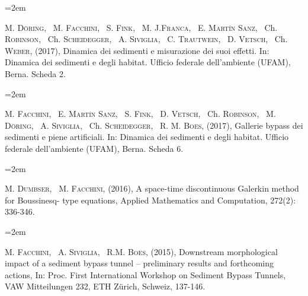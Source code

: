 \documentclass{scrartcl}
\newcommand{\MarginText}[1]{\marginpar{\raggedleft\itshape\small#1}} %
\newcommand{\Description}[1]{\hangindent=2em\hangafter=0\noindent\raggedright\footnotesize{#1}\par\normalsize\vspace{1em}} %
\begin{document}
\begin{cv}{}
	\Description{
	M. \textsc{Döring}, ~M. \textsc{Facchini}, ~S. \textsc{Fink}, ~M. J.\textsc{Franca}, ~E. \textsc{Martín Sanz}, ~Ch. \textsc{Robinson}, ~Ch. \textsc{Scheidegger}, ~A. \textsc{Siviglia}, ~C. \textsc{Trautwein}, ~D. \textsc{Vetsch}, ~Ch. \textsc{Weber}, (2017), Dinamica dei sedimenti e misurazione dei suoi effetti. In: Dinamica dei sedimenti e degli habitat. Ufficio federale dell’ambiente (UFAM), Berna. Scheda 2.}

	\Description{
	M. \textsc{Facchini}, ~E. \textsc{Martín Sanz}, ~S. \textsc{Fink}, ~D. \textsc{Vetsch}, ~Ch. \textsc{Robinson}, ~M. \textsc{Döring}, ~A. \textsc{Siviglia}, ~Ch. \textsc{Scheidegger}, ~R. M. \textsc{Boes}, (2017), Gallerie bypass dei sedimenti e piene artificiali. In: Dinamica dei sedimenti e degli habitat. Ufficio federale dell’ambiente (UFAM), Berna. Scheda 6.}


\Description{\MarginText{2016}
	M. \textsc{Dumbser}, ~M. \textsc{Facchini}, (2016), A space-time discontinuous Galerkin method for Boussinesq- type equations, Applied Mathematics and Computation, 272(2): 336-346.}


\Description{\MarginText{2015}
	M. \textsc{Facchini}, ~A. \textsc{Siviglia}, ~R.M. \textsc{Boes}, (2015), Downstream morphological impact of a sediment bypass tunnel – preliminary results and forthcoming actions, In: Proc. First International Workshop on Sediment Bypass Tunnels, VAW Mitteilungen 232, ETH Z\"urich, Schweiz, 137-146.}


\vspace{1em} %

%
%
%
%
%
%
%
%
%


\end{cv}
\end{document}
